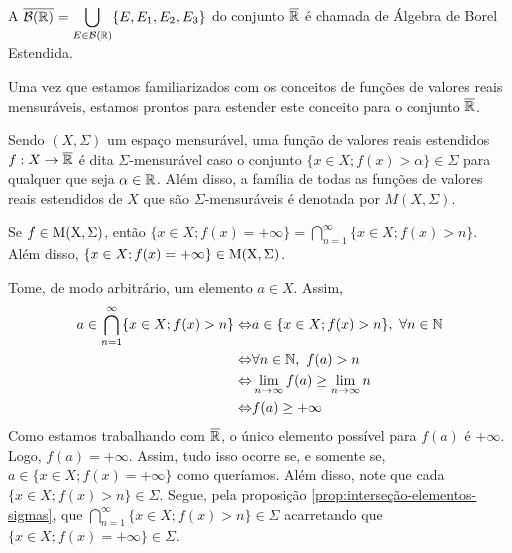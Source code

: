     \begin{definition}
    \label{def:algebra-borel-estendida}
        A \sigal $\overline{\operatorname{\mathcal{B}(\mathbb{R})}} = \displaystyle \bigcup_{E \in \operatorname{\mathcal{B}(\mathbb{R})}} \{E, E_1, E_2, E_3\}$ do conjunto $\operatorname{\overline{\mathbb{R}}}$ é chamada de Álgebra de Borel Estendida. 
    \end{definition}

    Uma vez que estamos familiarizados com os conceitos de funções de valores reais mensuráveis, estamos prontos para estender este conceito para o conjunto $\operatorname{\overline{\mathbb{R}}}$.

    \begin{definition}
    \label{def:familia-funcoes-mensuraveis}
        Sendo $(X, \Sigma)$ um espaço mensurável, uma função de valores reais estendidos $f: X \to \operatorname{\overline{\mathbb{R}}}$ é dita $\Sigma$-mensurável caso o conjunto
        $\{x \in X; f(x) > \alpha\} \in \Sigma$ para qualquer que seja $\alpha \in \mathbb{R}$. Além disso, a família de todas as funções de valores reais estendidos de $X$ que são $\Sigma$-mensuráveis é denotada por $M(X, \Sigma)$.
    \end{definition}

    \begin{proposition}
    \label{prop:identidade-intersecao-mais-infinito}
        Se $f \in \operatorname{M(X, \Sigma)}$, então $\{x \in X; f(x) = +\infty\} = \displaystyle \bigcap_{n = 1}^\infty \{x \in X; f(x) > n\}$.
        Além disso, $\{x \in X; f(x) = +\infty\} \in \operatorname{M(X, \Sigma)}$.
    \end{proposition}

    \begin{prova}
        Tome, de modo arbitrário, um elemento $a \in X$. 
        Assim, 
        \begin{align*}
            a \in \bigcap_{n = 1}^\infty \{x \in X; f(x) > n\} 
            \Leftrightarrow & a \in \{x \in X; f(x) > n\}, \ \forall n \in \N\\
            \Leftrightarrow & \forall n \in \N,\ f(a) > n\\
            \Leftrightarrow & \dlim_{n \to \infty} f(a) \geq \dlim_{n \to \infty} n\\
            \Leftrightarrow & f(a) \geq +\infty  
        \end{align*}
    Como estamos trabalhando com $\operatorname{\overline{\mathbb{R}}}$, o único elemento possível para $f(a)$ é $+\infty$.
    Logo, $f(a)  = + \infty$. Assim, tudo isso ocorre se, e somente se, $a \in \{x \in X; f(x) = +\infty\}$ como queríamos.
    Além disso, note que cada $\{x \in X; f(x) > n\} \in \Sigma$.
    Segue, pela proposição \ref{prop:interseção-elementos-sigmas}, que $\displaystyle \bigcap_{n = 1}^\infty \{x \in X; f(x) > n\} \in \Sigma$ acarretando que $\{x \in X; f(x) = +\infty\} \in \Sigma$. 
    \end{prova}

